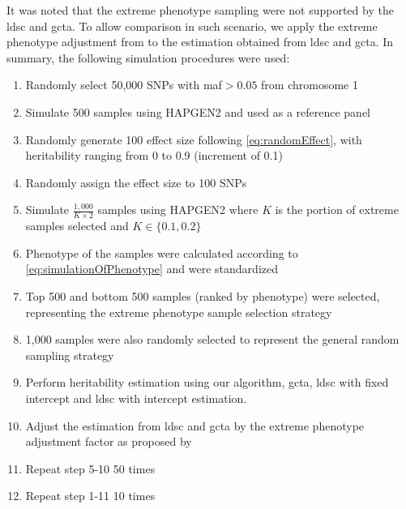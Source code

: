 		It was noted that the extreme phenotype sampling were not supported by the \gls{ldsc} and \gls{gcta}.
		To allow comparison in such scenario, we apply the extreme phenotype adjustment from \citet{Sham2014} to the estimation obtained from \gls{ldsc} and \gls{gcta}.
		In summary, the following simulation procedures were used:
		\begin{enumerate}
			\item Randomly select 50,000 \glspl{SNP} with \gls{maf}$>0.05$ from chromosome 1
			\item Simulate 500 samples using HAPGEN2 and used as a reference panel
			\item Randomly generate 100 effect size following \cref{eq:randomEffect}, with heritability ranging from 0 to 0.9 (increment of 0.1)
			\item Randomly assign the effect size to 100 \glspl{SNP}
			\item Simulate $\frac{1,000}{K\times2}$ samples using HAPGEN2 where $K$ is the portion of extreme samples selected and $K\in\{0.1,0.2\}$
			\item Phenotype of the samples were calculated according to \cref{eq:simulationOfPhenotype} and were standardized
			\item Top 500 and bottom 500 samples (ranked by phenotype) were selected, representing the extreme phenotype sample selection strategy
			\item 1,000 samples were also randomly selected to represent the general random sampling strategy
			\item Perform heritability estimation using our algorithm, \gls{gcta}, \gls{ldsc} with fixed intercept and \gls{ldsc} with intercept estimation.
			\item Adjust the estimation from \gls{ldsc} and \gls{gcta} by the extreme phenotype adjustment factor as proposed by \citet{Sham2014}
			\item Repeat step 5-10 50 times
			\item Repeat step 1-11 10 times
		\end{enumerate}
		
		
	
